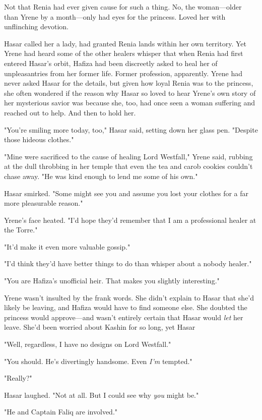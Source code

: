 Not that Renia had ever given cause for such a thing. No, the woman---older than Yrene by a month---only had eyes for the princess. Loved her with unflinching devotion.

Hasar called her a lady, had granted Renia lands within her own territory. Yet Yrene had heard some of the other healers whisper that when Renia had first entered Hasar's orbit, Hafiza had been discreetly asked to heal her of  unpleasantries from her former life. Former profession, apparently. Yrene had never asked Hasar for the details, but given how loyal Renia was to the princess, she often wondered if the reason why Hasar so loved to hear Yrene's own story of her mysterious savior was because she, too, had once seen a woman suffering and reached out to help. And then to hold her.

"You're smiling more today, too," Hasar said, setting down her glass pen. "Despite those hideous clothes."

"Mine were sacrificed to the cause of healing Lord Westfall," Yrene said, rubbing at the dull throbbing in her temple that even the tea and carob cookies couldn't chase away. "He was kind enough to lend me some of his own."

Hasar smirked. "Some might see you and assume you lost your clothes for a far more pleasurable reason."

Yrene's face heated. "I'd hope they'd remember that I am a professional healer at the Torre."

"It'd make it even more valuable gossip."

"I'd think they'd have better things to do than whisper about a nobody healer."

"You are Hafiza's unofficial heir. That makes you slightly interesting."

Yrene wasn't insulted by the frank words. She didn't explain to Hasar that she'd likely be leaving, and Hafiza would have to find someone else. She doubted the princess would approve---and wasn't entirely certain that Hasar would \emph{let} her leave. She'd been worried about Kashin for so long, yet Hasar 

"Well, regardless, I have no designs on Lord Westfall."

"You should. He's divertingly handsome. Even \emph{I'm} tempted."

"Really?"

Hasar laughed. "Not at all. But I could see why \emph{you} might be."

"He and Captain Faliq are involved."

